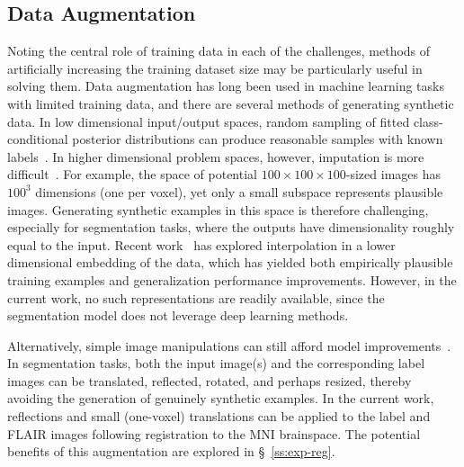 \subsection{Data Augmentation}\label{ss:vlr-reg-aug}
Noting the central role of training data in each of the challenges,
methods of artificially increasing the training dataset size
may be particularly useful in solving them.
Data augmentation has long been used in machine learning tasks with limited training data,
and there are several methods of generating synthetic data.
In low dimensional input/output spaces,
random sampling of fitted class-conditional posterior distributions
can produce reasonable samples with known labels~\cite{Tanner1987}.
In higher dimensional problem spaces, however, imputation is more difficult~\cite{Goodfellow2014}.
For example, the space of potential $100\times100\times100$-sized images has $100^3$ dimensions
(one per voxel), yet only a small subspace represents plausible images.
Generating synthetic examples in this space is therefore challenging,
especially for segmentation tasks,
where the outputs have dimensionality roughly equal to the input.
Recent work~\cite{Devries2017,Zhang2017} has explored interpolation
in a lower dimensional embedding of the data,
which has yielded both empirically plausible training examples
and generalization performance improvements.
However, in the current work, no such representations are readily available,
since the segmentation model does not leverage deep learning methods.
\par
Alternatively, simple image manipulations can still afford model improvements~\cite{Krizhevsky2012}.
In segmentation tasks, both the input image(s) and the corresponding label images can be
translated, reflected, rotated, and perhaps resized,
thereby avoiding the generation of genuinely synthetic examples.
In the current work, reflections and small (one-voxel) translations
can be applied to the label and FLAIR images following registration to the MNI brainspace.
The potential benefits of this augmentation are explored in \S~\ref{ss:exp-reg}.
